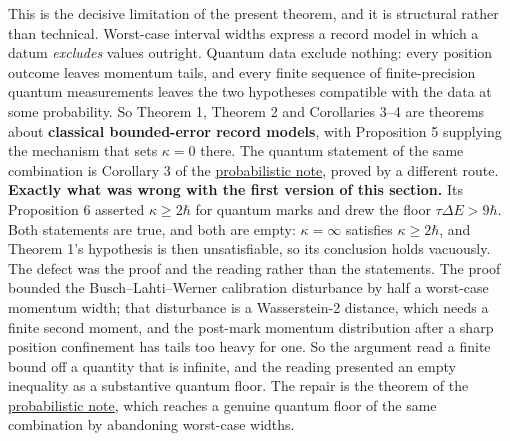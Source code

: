 \documentclass[11pt,a4paper]{article}
\begin{document}
This is the decisive limitation of the present theorem, and it is
structural rather than technical. Worst-case interval widths express a
record model in which a datum \emph{excludes} values outright. Quantum
data exclude nothing: every position outcome leaves momentum tails, and
every finite sequence of finite-precision quantum measurements leaves
the two hypotheses compatible with the data at some probability. So
Theorem 1, Theorem 2 and Corollaries 3--4 are theorems about
\textbf{classical bounded-error record models}, with Proposition 5
supplying the mechanism that sets \(\kappa=0\) there. The quantum
statement of the same combination is Corollary 3 of the
\href{planck-gap-probabilistic.md}{probabilistic note}, proved by a
different route. \textbf{Exactly what was wrong with the first version
of this section.} Its Proposition 6 asserted \(\kappa\ge2\hbar\) for
quantum marks and drew the floor \(\tau\Delta E>9\hbar\). Both
statements are true, and both are empty: \(\kappa=\infty\) satisfies
\(\kappa\ge2\hbar\), and Theorem 1's hypothesis is then unsatisfiable,
so its conclusion holds vacuously. The defect was the proof and the
reading rather than the statements. The proof bounded the
Busch--Lahti--Werner calibration disturbance by half a worst-case
momentum width; that disturbance is a Wasserstein-2 distance, which
needs a finite second moment, and the post-mark momentum distribution
after a sharp position confinement has tails too heavy for one. So the
argument read a finite bound off a quantity that is infinite, and the
reading presented an empty inequality as a substantive quantum floor.
The repair is the theorem of the
\href{planck-gap-probabilistic.md}{probabilistic note}, which reaches a
genuine quantum floor of the same combination by abandoning worst-case
widths.
\end{document}
